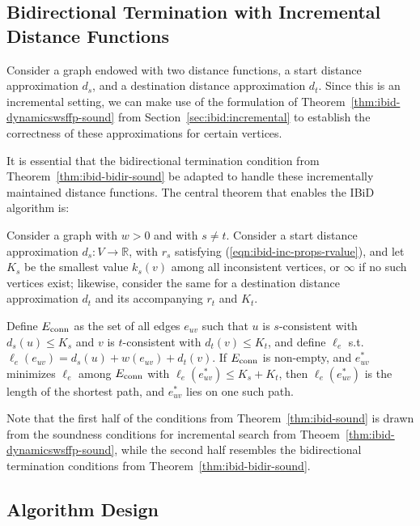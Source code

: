 \subsection{Bidirectional Termination with Incremental Distance Functions}

Consider a graph endowed with two distance functions,
a start distance approximation $d_s$,
and a destination distance approximation $d_t$.
Since this is an incremental setting,
we can make use of the formulation
of Theorem~\ref{thm:ibid-dynamicswsffp-sound}
from Section~\ref{sec:ibid:incremental}
to establish the correctness of these approximations
for certain vertices.

It is essential that the bidirectional termination condition from
Theorem~\ref{thm:ibid-bidir-sound} be adapted to
handle these incrementally maintained distance functions.
The central theorem that enables the IBiD algorithm is:

\begin{theorem}
Consider a graph with $w > 0$ and with $s \neq t$.
Consider a start distance approximation $d_s: V \rightarrow \mathbb{R}$,
with $r_s$ satisfying (\ref{eqn:ibid-inc-props-rvalue}),
and let $K_s$ be the smallest value $k_s(v)$
among all inconsistent vertices,
or $\infty$ if no such vertices exist;
likewise, consider the same for a destination distance approximation
$d_t$ and its accompanying $r_t$ and $K_t$.

Define $E_{\mbox{\scriptsize conn}}$ as the set of all edges $e_{uv}$ such that
$u$ is $s$-consistent with $d_s(u) \leq K_s$
and $v$ is $t$-consistent with $d_t(v) \leq K_t$,
and define $\ell_e$ s.t. $\ell_e(e_{uv}) = d_s(u) + w(e_{uv}) + d_t(v)$.
If $E_{\mbox{\scriptsize conn}}$ is non-empty,
and $e^*_{uv}$ minimizes $\ell_e$
among $E_{\mbox{\scriptsize conn}}$ with $\ell_e(e^*_{uv}) \leq K_s + K_t$,
then $\ell_e(e^*_{uv})$ is the length of the shortest path,
and $e^*_{uv}$ lies on one such path.
\label{thm:ibid-sound}
\end{theorem}

Note that the first half of the conditions
from Theorem~\ref{thm:ibid-sound}
is drawn from the soundness conditions for incremental search
from Theoem~\ref{thm:ibid-dynamicswsffp-sound},
while the second half resembles the bidirectional termination
conditions from Theorem~\ref{thm:ibid-bidir-sound}.

\subsection{Algorithm Design}

